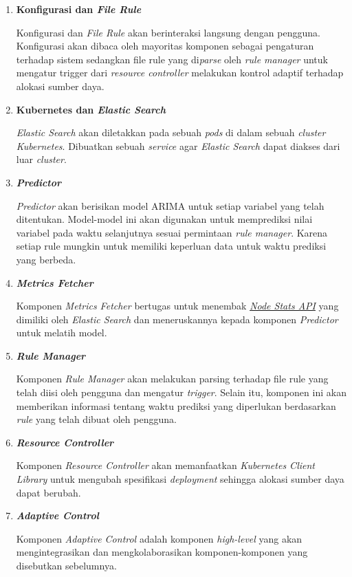 \begin{enumerate}
    \item \textbf{Konfigurasi dan \textit{File Rule}}
    
    Konfigurasi dan \textit{File Rule} akan berinteraksi langsung dengan pengguna. Konfigurasi akan dibaca oleh mayoritas komponen sebagai pengaturan terhadap sistem sedangkan file rule yang di\textit{parse} oleh \textit{rule manager} untuk mengatur trigger dari \textit{resource controller} melakukan kontrol adaptif terhadap alokasi sumber daya.

    \item \textbf{Kubernetes dan \textit{Elastic Search}}
    
    \textit{Elastic Search} akan diletakkan pada sebuah \textit{pods} di dalam sebuah \textit{cluster Kubernetes}. Dibuatkan sebuah \textit{service} agar \textit{Elastic Search} dapat diakses dari luar \textit{cluster}.
    
    \item \textbf{\textit{Predictor}}
    
    \textit{Predictor} akan berisikan model ARIMA untuk setiap variabel yang telah ditentukan. Model-model ini akan digunakan untuk memprediksi nilai variabel pada waktu selanjutnya sesuai permintaan \textit{rule manager}. Karena setiap rule mungkin untuk memiliki keperluan data untuk waktu prediksi yang berbeda.

    \item \textbf{\textit{Metrics Fetcher}}
    
    Komponen \textit{Metrics Fetcher} bertugas untuk menembak \href{https://www.elastic.co/guide/en/elasticsearch/reference/current/cluster-nodes-stats.html}{\textit{Node Stats API}} yang dimiliki oleh \textit{Elastic Search} dan meneruskannya kepada komponen \textit{Predictor} untuk melatih model.

    \item \textbf{\textit{Rule Manager}}
    
    Komponen \textit{Rule Manager} akan melakukan parsing terhadap file rule yang telah diisi oleh pengguna dan mengatur \textit{trigger}. Selain itu, komponen ini akan memberikan informasi tentang waktu prediksi yang diperlukan berdasarkan \textit{rule} yang telah dibuat oleh pengguna.

    \item \textbf{\textit{Resource Controller}}
    
    Komponen \textit{Resource Controller} akan memanfaatkan \textit{Kubernetes Client Library} untuk mengubah spesifikasi \textit{deployment} sehingga alokasi sumber daya dapat berubah.

    \item \textbf{\textit{Adaptive Control}}
    
    Komponen \textit{Adaptive Control} adalah komponen \textit{high-level} yang akan mengintegrasikan dan mengkolaborasikan komponen-komponen yang disebutkan sebelumnya.
\end{enumerate}